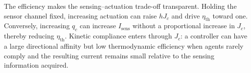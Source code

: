 The efficiency makes the sensing--actuation trade-off transparent. Holding the
sensor channel fixed, increasing actuation can raise $hJ_c$ and drive
$\eta_{\mathrm{th}}$ toward one. Conversely, increasing $q_c$ can increase
$I_{\mathrm{sens}}$ without a proportional increase in $J_c$, thereby reducing
$\eta_{\mathrm{th}}$. Kinetic compliance enters through $J_c$: a controller can
have a large directional affinity but low thermodynamic efficiency when agents
rarely comply and the resulting current remains small relative to the sensing
information acquired.
